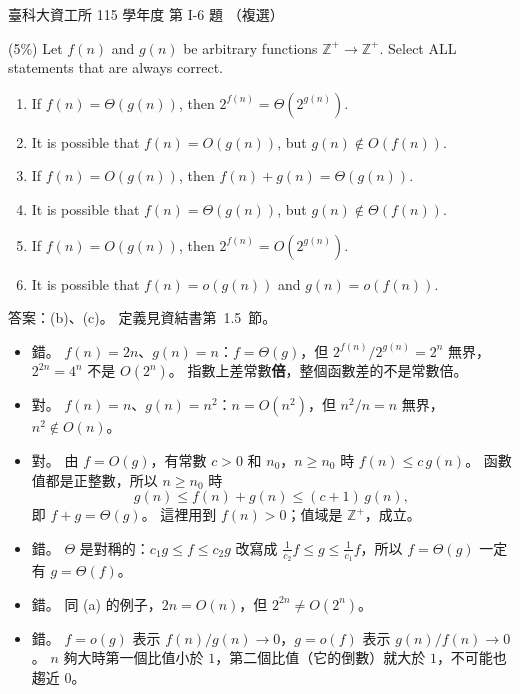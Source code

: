 \begin{pastexam}[label={px:ntust-115-ice-06}]{臺科大資工所 115 學年度 第 I-6 題}
（複選）

(5\%) Let $f(n)$ and $g(n)$ be arbitrary functions $\mathbb{Z}^+\to\mathbb{Z}^+$. Select ALL statements that are
always correct.
\begin{enumerate}[label=(\alph*)]
\item If $f(n)=\Theta(g(n))$, then $2^{f(n)}=\Theta(2^{g(n)})$.
\item It is possible that $f(n)=O(g(n))$, but $g(n)\notin O(f(n))$.
\item If $f(n)=O(g(n))$, then $f(n)+g(n)=\Theta(g(n))$.
\item It is possible that $f(n)=\Theta(g(n))$, but $g(n)\notin\Theta(f(n))$.
\item If $f(n)=O(g(n))$, then $2^{f(n)}=O(2^{g(n)})$.
\item It is possible that $f(n)=o(g(n))$ and $g(n)=o(f(n))$.
\end{enumerate}
\end{pastexam}

\begin{pastsoln}
答案：(b)、(c)。 定義見資結書第~1.5~節。

\begin{itemize}
\item[(a)] 錯。 $f(n) = 2n$、$g(n) = n$：$f = \Theta(g)$，但 $2^{f(n)} / 2^{g(n)} = 2^n$ 無界，$2^{2n} = 4^n$ 不是
$O(2^n)$。 指數上差常數\textbf{倍}，整個函數差的不是常數倍。
\item[(b)] 對。 $f(n) = n$、$g(n) = n^2$：$n = O(n^2)$，但 $n^2 / n = n$ 無界，$n^2 \notin O(n)$。
\item[(c)] 對。 由 $f = O(g)$，有常數 $c > 0$ 和 $n_0$，$n \ge n_0$ 時 $f(n) \le c\, g(n)$。 函數值都是正整數，所以
$n \ge n_0$ 時
\[
g(n) \le f(n) + g(n) \le (c + 1)\, g(n),
\]
即 $f + g = \Theta(g)$。 這裡用到 $f(n) > 0$；值域是 $\mathbb{Z}^+$，成立。
\item[(d)] 錯。 $\Theta$ 是對稱的：$c_1 g \le f \le c_2 g$ 改寫成 $\frac{1}{c_2} f \le g \le \frac{1}{c_1} f$，所以
$f = \Theta(g)$ 一定有 $g = \Theta(f)$。
\item[(e)] 錯。 同 (a) 的例子，$2n = O(n)$，但 $2^{2n} \ne O(2^n)$。
\item[(f)] 錯。 $f = o(g)$ 表示 $f(n)/g(n) \to 0$，$g = o(f)$ 表示 $g(n)/f(n) \to 0$。 $n$ 夠大時第一個比值小於
$1$，第二個比值（它的倒數）就大於 $1$，不可能也趨近 $0$。
\end{itemize}
\end{pastsoln}
